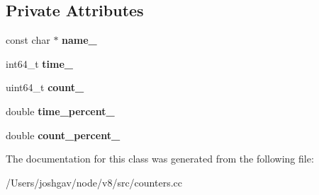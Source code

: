 \subsection*{Private Attributes}
\begin{DoxyCompactItemize}
\item 
const char $\ast$ {\bfseries name\+\_\+}\hypertarget{classv8_1_1internal_1_1_runtime_call_stat_entries_1_1_entry_ab82c161218904762a605a58c7c144699}{}\label{classv8_1_1internal_1_1_runtime_call_stat_entries_1_1_entry_ab82c161218904762a605a58c7c144699}

\item 
int64\+\_\+t {\bfseries time\+\_\+}\hypertarget{classv8_1_1internal_1_1_runtime_call_stat_entries_1_1_entry_a15032e568e2a3f097a214c7d2d69dc24}{}\label{classv8_1_1internal_1_1_runtime_call_stat_entries_1_1_entry_a15032e568e2a3f097a214c7d2d69dc24}

\item 
uint64\+\_\+t {\bfseries count\+\_\+}\hypertarget{classv8_1_1internal_1_1_runtime_call_stat_entries_1_1_entry_a6616bbc770bfc8402c9d30f141b883bc}{}\label{classv8_1_1internal_1_1_runtime_call_stat_entries_1_1_entry_a6616bbc770bfc8402c9d30f141b883bc}

\item 
double {\bfseries time\+\_\+percent\+\_\+}\hypertarget{classv8_1_1internal_1_1_runtime_call_stat_entries_1_1_entry_a1000e45a41319a6baae3d0c2b7cdfc69}{}\label{classv8_1_1internal_1_1_runtime_call_stat_entries_1_1_entry_a1000e45a41319a6baae3d0c2b7cdfc69}

\item 
double {\bfseries count\+\_\+percent\+\_\+}\hypertarget{classv8_1_1internal_1_1_runtime_call_stat_entries_1_1_entry_ae0820b8e276f79a103ff38bf2b7d60dd}{}\label{classv8_1_1internal_1_1_runtime_call_stat_entries_1_1_entry_ae0820b8e276f79a103ff38bf2b7d60dd}

\end{DoxyCompactItemize}


The documentation for this class was generated from the following file\+:\begin{DoxyCompactItemize}
\item 
/\+Users/joshgav/node/v8/src/counters.\+cc\end{DoxyCompactItemize}
